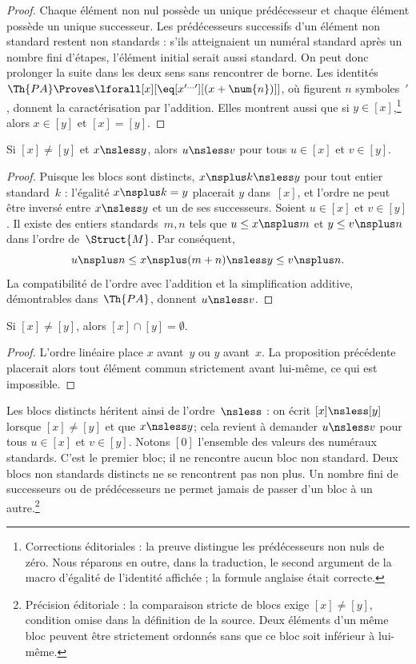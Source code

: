 \documentclass[../../../include/open-logic-section]{subfiles}
\begin{document}
\begin{proof}
Chaque élément non nul possède un unique
prédécesseur et chaque élément possède
un unique successeur. Les prédécesseurs
successifs d'un élément non standard
restent non standards : s'ils atteignaient
un numéral standard après un nombre fini
d'étapes, l'élément initial serait aussi
standard. On peut donc prolonger la suite
dans les deux sens sans rencontrer de borne.
Les identités
$\Th{PA}\Proves
\lforall[x][\eq[x^{\prime\dots\prime}]
[(x+\num{n})]]$,
où figurent $n$ symboles~$\prime$,
donnent la caractérisation par l'addition.
Elles montrent aussi que si $y\in[x]$,\footnote{Corrections éditoriales : la preuve distingue les prédécesseurs non nuls de zéro. Nous réparons en outre, dans la traduction, le second argument de la macro d'égalité de l'identité affichée ; la formule anglaise était correcte.}
alors $x\in[y]$ et $[x]=[y]$.
\end{proof}

\begin{prop}
Si $[x]\neq[y]$ et $x\nsless y$,
alors $u\nsless v$ pour tous
$u\in[x]$ et $v\in[y]$.
\end{prop}

\begin{proof}
Puisque les blocs sont distincts,
$x\nsplus k\nsless y$ pour tout
entier standard~$k$ : l'égalité
$x\nsplus k=y$ placerait $y$ dans~$[x]$,
et l'ordre ne peut être inversé entre
$x\nsless y$ et un de ses successeurs.
Soient $u\in[x]$ et $v\in[y]$.
Il existe des entiers standards~$m,n$
tels que $u\leq x\nsplus m$ et
$y\leq v\nsplus n$ dans l'ordre
de~$\Struct{M}$. Par conséquent,
\[
u\nsplus n
\leq x\nsplus(m+n)
\nsless y
\leq v\nsplus n.
\]
La compatibilité de l'ordre avec l'addition
et la simplification additive, démontrables
dans~$\Th{PA}$, donnent $u\nsless v$.
\end{proof}

\begin{cor}
Si $[x]\neq[y]$, alors
$[x]\cap[y]=\emptyset$.
\end{cor}

\begin{proof}
L'ordre linéaire place $x$ avant~$y$
ou $y$ avant~$x$. La proposition
précédente placerait alors tout élément
commun strictement avant lui-même,
ce qui est impossible.
\end{proof}

\begin{explain}
Les blocs distincts héritent ainsi
de l'ordre~$\nsless$ : on écrit
$[x]\nsless[y]$ lorsque $[x]\neq[y]$
et que $x\nsless y$; cela revient à
demander $u\nsless v$ pour tous
$u\in[x]$ et $v\in[y]$.
Notons $[0]$ l'ensemble des valeurs
des numéraux standards. C'est le premier
bloc; il ne rencontre aucun bloc
non standard. Deux blocs non standards
distincts ne se rencontrent pas non plus.
Un nombre fini de successeurs ou de
prédécesseurs ne permet jamais de passer
d'un bloc à un autre.\footnote{Précision éditoriale : la comparaison stricte de blocs exige $[x]\neq[y]$, condition omise dans la définition de la source. Deux éléments d'un même bloc peuvent être strictement ordonnés sans que ce bloc soit inférieur à lui-même.}
\end{explain}
\end{document}
